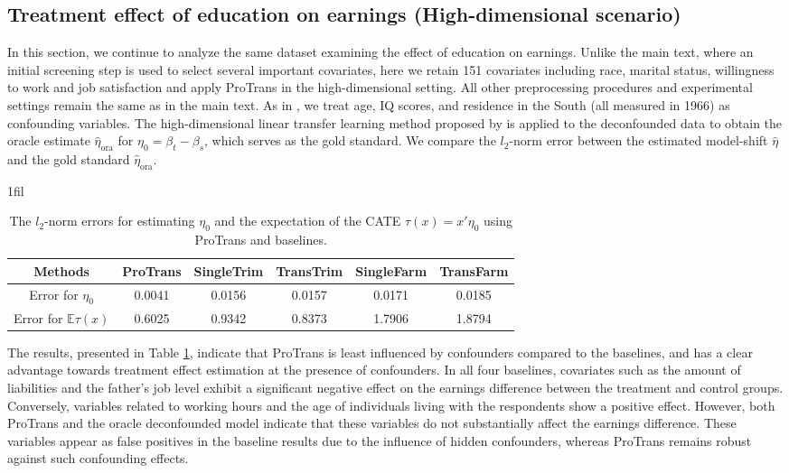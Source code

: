 \documentclass[12pt]{article}
\makeatletter
\newcommand*{\centerfloat}{%
  \parindent \z@
  \leftskip \z@ \@plus 1fil \@minus \marginparwidth
  \rightskip \leftskip
  \parfillskip \z@skip}
\makeatother
\begin{document}
\subsection{Treatment effect of education on earnings (High-dimensional scenario)}
In this section, we continue to analyze the same dataset examining the effect of education on earnings. Unlike the main text, where an initial screening step is used to select several important covariates, here we retain 151 covariates including race, marital status, willingness to work and job satisfaction and apply ProTrans in the high-dimensional setting. All other preprocessing procedures and experimental settings remain the same as in the main text. As in \cite{wang2018bounded}, we treat age, IQ scores, and residence in the South (all measured in 1966) as confounding variables. The high-dimensional linear transfer learning method proposed by \citet{li2022transfer} is applied to the deconfounded data to obtain the oracle estimate $\hat{\eta}_{\text{ora}}$ for $\eta_0 = \beta_t - \beta_s$, which serves as the gold standard. We compare the $l_2$-norm error between the estimated model-shift $\hat{\eta}$ and the gold standard $\hat{\eta}_{\text{ora}}$. 

\begin{table}[ht]
\renewcommand{\arraystretch}{0.65}
\footnotesize
    \centerfloat
    \caption{The $l_2$-norm errors for estimating $\eta_0$ and the expectation of the CATE $\tau(x) = x'\eta_0$ using ProTrans and baselines.}
    \label{tab:earning_estimation}
    \begin{tabular}{cccccc}
        \toprule
        \textbf{Methods} & ProTrans & SingleTrim & TransTrim & SingleFarm & TransFarm\\
        \midrule
        Error for $\eta_0$ & 
        0.0041& 0.0156& 0.0157& 0.0171& 0.0185\\
        Error for $\mathbb{E}\tau(x)$ &0.6025& 0.9342& 0.8373& 1.7906& 1.8794\\
        \bottomrule
    \end{tabular}
\end{table}

The results, presented in Table \ref{tab:earning_estimation}, indicate that ProTrans is least influenced by confounders compared to the baselines, and has a clear advantage towards treatment effect estimation at the presence of confounders. In all four baselines, covariates such as the amount of liabilities and the father's job level exhibit a significant negative effect on the earnings difference between the treatment and control groups. Conversely, variables related to working hours and the age of individuals living with the respondents show a positive effect. However, both ProTrans and the oracle deconfounded model indicate that these variables do not substantially affect the earnings difference. These variables appear as false positives in the baseline results due to the influence of hidden confounders, whereas ProTrans remains robust against such confounding effects.
\end{document}
